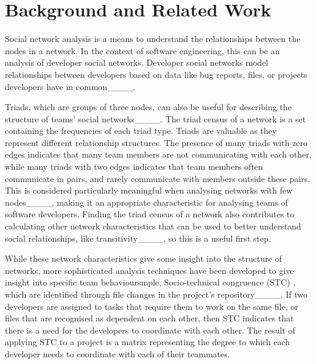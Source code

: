 \section{Background and Related Work}
\label{rel_work}
Social network analysis is a means to understand the relationships between the nodes in a network. In the context of software engineering, this can be an analysis of developer social networks. Developer social networks model relationships between developers based on data like bug reports, files, or projects developers have in common____. 



Triads, which are groups of three nodes, can also be useful for describing the structure of teams' social networks____.  The triad census of a network is a set containing the frequencies of each triad type. Triads are valuable as they represent different relationship structures. The presence of many triads with zero edges indicates that many team members are not communicating with each other, while many triads with two edges indicates that team members often communicate in pairs, and rarely communicate with members outside these pairs. This is considered particularly meaningful when analysing networks with few nodes____, making it an appropriate characteristic for analysing teams of software developers. Finding the triad census of a network also contributes to calculating other network characteristics that can be used to better understand social relationships, like transitivity____, so this is a useful first step. 

While these network characteristics give some insight into the structure of networks, more sophisticated analysis techniques have been developed to give insight into specific team behavioursmple, Socio-technical congruence (STC) , which are identified through file changes in the project's repository____. If two developers are assigned to tasks that require them to work on the same file, or files that are recognised as dependent on each other, then STC indicates that there is a need for the developers to coordinate with each other. The result of applying STC to a project is a matrix representing the degree to which each developer needs to coordinate with each of their teammates. 

